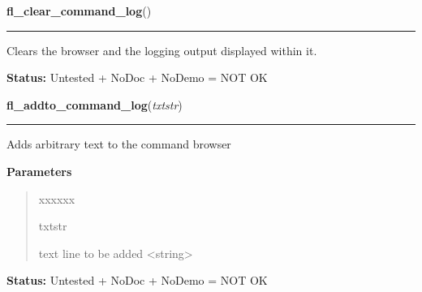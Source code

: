     \label{xformslib:library:fl_clear_command_log}

    \vspace{0.5ex}

\hspace{.8\funcindent}\begin{boxedminipage}{\funcwidth}

    \raggedright \textbf{fl\_clear\_command\_log}()

    \vspace{-1.5ex}

    \rule{\textwidth}{0.5\fboxrule}
\setlength{\parskip}{2ex}
    Clears the browser and the logging output displayed within it.

\setlength{\parskip}{1ex}
\textbf{Status:} Untested + NoDoc + NoDemo = NOT OK



    \end{boxedminipage}

    \label{xformslib:library:fl_addto_command_log}

    \vspace{0.5ex}

\hspace{.8\funcindent}\begin{boxedminipage}{\funcwidth}

    \raggedright \textbf{fl\_addto\_command\_log}(\textit{txtstr})

    \vspace{-1.5ex}

    \rule{\textwidth}{0.5\fboxrule}
\setlength{\parskip}{2ex}
    Adds arbitrary text to the command browser

\setlength{\parskip}{1ex}
      \textbf{Parameters}
      \vspace{-1ex}

      \begin{quote}
        \begin{Ventry}{xxxxxx}

          \item[txtstr]

          text line to be added {\textless}string{\textgreater}

        \end{Ventry}

      \end{quote}

\textbf{Status:} Untested + NoDoc + NoDemo = NOT OK



    \end{boxedminipage}

